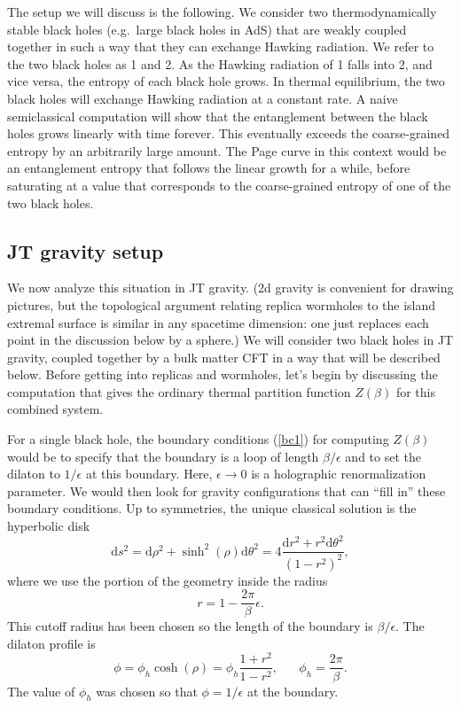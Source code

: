 \documentclass[12pt]{article}
\newcommand{\be}{\begin{equation}}
\newcommand{\ee}{\end{equation}}
\numberwithin{equation}{section}
\begin{document}
The setup we will discuss is the following. We consider two thermodynamically stable black holes (e.g.~large black holes in AdS) that are weakly coupled together in such a way that they can exchange Hawking radiation. We refer to the two black holes as 1 and 2. As the Hawking radiation of 1 falls into 2, and vice versa, the entropy of each black hole grows. In thermal equilibrium, the two black holes will exchange Hawking radiation at a constant rate. A naive semiclassical computation will show that the entanglement between the black holes grows linearly with time forever. This eventually exceeds the coarse-grained entropy by an arbitrarily large amount. The Page curve in this context would be an entanglement entropy that follows the linear growth for a while, before saturating at a value that corresponds to the coarse-grained entropy of one of the two black holes.

\subsection{JT gravity setup}
We now analyze this situation in JT gravity. (2d gravity is convenient for drawing pictures, but the topological argument relating replica wormholes to the island extremal surface is similar in any spacetime dimension: one just replaces each point in the discussion below by a sphere.) We will consider two black holes in JT gravity, coupled together by a bulk matter CFT in a way that will be described below. Before getting into replicas and wormholes, let's begin by discussing the computation that gives the ordinary thermal partition function $Z(\beta)$ for this combined system.

For a single black hole, the boundary conditions (\ref{bc1}) for computing $Z(\beta)$ would be to specify that the boundary is a loop of length $\beta/\epsilon$ and to set the dilaton to $1/\epsilon$ at this boundary. Here, $\epsilon \rightarrow 0$ is a holographic renormalization parameter. We would then look for gravity configurations that can ``fill in'' these boundary conditions. Up to symmetries, the unique classical solution is the hyperbolic disk
\be
\mathrm{d}s^2 = \mathrm{d}\rho^2 + \sinh^2(\rho)\mathrm{d}\theta^2 = 4\frac{\mathrm{d}r^2 + r^2\mathrm{d}\theta^2}{(1-r^2)^2},\label{rotinv}
\ee
where we use the portion of the geometry inside the radius
\be
r = 1 - \frac{2\pi}{\beta}\epsilon.
\ee
This cutoff radius has been chosen so the length of the boundary is $\beta / \epsilon$. The  dilaton profile is
\be
\phi = \phi_h \cosh(\rho) = \phi_h \frac{1+r^2}{1-r^2}, \hspace{20pt} \phi_h = \frac{2\pi}{\beta}.
\ee
The value of $\phi_h$ was chosen so that $\phi = 1/\epsilon$ at the boundary.
\end{document}
